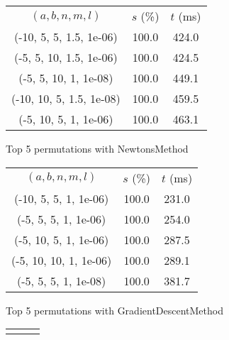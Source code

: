 \begin{figure}[H]
\label{fig:param_comp_MatrixSquareSum_UniformSearch}
\begin{subfigure}[ht]{.5\textwidth}
\begin{tabular}{|c|c|c|}
\hline
\rowcolor{gray!25}
\multicolumn{3}{|c|}{NewtonsMethod} \\
\hline
\rowcolor{gray!25}
$(a,b,n,m,l)$ & $s$ (\%) & $t$ (ms) \\
\hline
(-10, 5, 5, 1.5, 1e-06) & 100.0 & 424.0 \\
(-5, 5, 10, 1.5, 1e-06) & 100.0 & 424.5 \\
(-5, 5, 10, 1, 1e-08) & 100.0 & 449.1 \\
(-10, 10, 5, 1.5, 1e-08) & 100.0 & 459.5 \\
(-5, 10, 5, 1, 1e-06) & 100.0 & 463.1 \\
\hline
\end{tabular}
\caption{Top 5 permutations with NewtonsMethod}
\label{subfig:param_comp_MatrixSquareSum_NewtonsMethod_UniformSearch}
\end{subfigure}
\hfill
\begin{subfigure}[ht]{.5\textwidth}
\begin{tabular}{|c|c|c|}
\hline
\rowcolor{gray!25}
\multicolumn{3}{|c|}{GradientDescentMethod} \\
\hline
\rowcolor{gray!25}
$(a,b,n,m,l)$ & $s$ (\%) & $t$ (ms) \\
\hline
(-10, 5, 5, 1, 1e-06) & 100.0 & 231.0 \\
(-5, 5, 5, 1, 1e-06) & 100.0 & 254.0 \\
(-5, 10, 5, 1, 1e-06) & 100.0 & 287.5 \\
(-5, 10, 10, 1, 1e-06) & 100.0 & 289.1 \\
(-5, 5, 5, 1, 1e-08) & 100.0 & 381.7 \\
\hline
\end{tabular}
\caption{Top 5 permutations with GradientDescentMethod}
\label{subfig:param_comp_MatrixSquareSum_GradientDescentMethod_UniformSearch}
\end{subfigure}
\hfill
\begin{subfigure}[ht]{.5\textwidth}
\begin{tabular}{|c|c|c|}
\hline
\rowcolor{gray!25}
\multicolumn{3}{|c|}{ConjugateGradientMethod} \\

\end{tabular}
\end{subfigure}
\end{figure}
